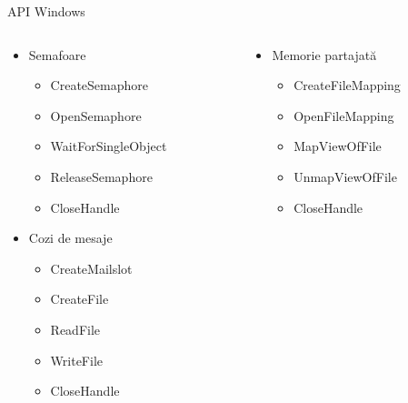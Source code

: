 \documentclass{so.cs.pub.ro}
\begin{document}
\begin{frame}{API Windows}
\begin{columns}
\begin{column}[1]{0.43\textwidth}
  \begin{itemize}
		\item Semafoare
	   \begin{itemize}
			\item CreateSemaphore
			\item OpenSemaphore
			\item WaitForSingleObject
			\item ReleaseSemaphore
			\item CloseHandle
  		\end{itemize}
		\vspace{0.1cm}  
  		\item Cozi de mesaje
  		\begin{itemize}
			\begin{beamerboxesrounded}[lower=block body,shadow=true]{}
      		\small{\centerline {\textbackslash\textbackslash.\textbackslash mailslot\textbackslash [path]$<$nume$>$}}
			\end{beamerboxesrounded}
			\vspace{0.1cm}  
			\item CreateMailslot
			\item CreateFile 
			\item ReadFile
			\item WriteFile
			\item CloseHandle
 		\end{itemize}
  \end{itemize}
\end{column}
\begin{column}[1]{0.57\textwidth}
      \begin{itemize}
      	\item Memorie partajată
  			\begin{itemize}
				\item CreateFileMapping
				\item OpenFileMapping
				\item MapViewOfFile
				\item UnmapViewOfFile
				\item CloseHandle
  			\end{itemize}        
      \end{itemize}
\end{column}
\end{columns}
\end{frame}
\end{document}
